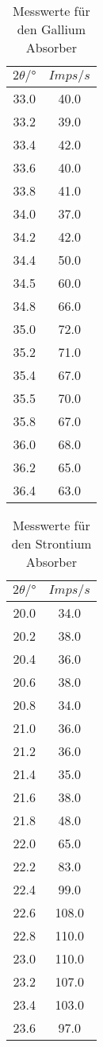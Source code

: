 \begin{table}[H]
    \centering
    \caption{Messwerte für den Gallium Absorber}
    \label{tab:6}
    \begin{tabular}{c c}
        \toprule
        $2 \theta /° $ & $Imps/s$ \\
        \midrule
        33.0  & 40.0 \\
        33.2  & 39.0 \\
        33.4  & 42.0 \\
        33.6  & 40.0 \\
        33.8  & 41.0 \\
        34.0  & 37.0 \\
        34.2  & 42.0 \\
        34.4  & 50.0 \\
        34.5  & 60.0 \\
        34.8  & 66.0 \\
        35.0  & 72.0 \\
        35.2  & 71.0 \\
        35.4  & 67.0 \\
        35.5  & 70.0 \\
        35.8  & 67.0 \\
        36.0  & 68.0 \\
        36.2  & 65.0 \\
        36.4  & 63.0 \\
        \bottomrule
    \end{tabular}
\end{table}

\begin{table}[H]
    \centering
    \caption{Messwerte für den Strontium Absorber}
    \label{tab:7}
    \begin{tabular}{c c}
        \toprule
        $2 \theta /° $ & $Imps/s$ \\
        \midrule
        20.0  & 34.0 \\
        20.2  & 38.0 \\
        20.4  & 36.0 \\
        20.6  & 38.0 \\
        20.8  & 34.0 \\
        21.0  & 36.0 \\
        21.2  & 36.0 \\
        21.4  & 35.0 \\
        21.6  & 38.0 \\
        21.8  & 48.0 \\
        22.0  & 65.0 \\
        22.2  & 83.0 \\
        22.4  & 99.0 \\
        22.6  & 108.0\\
        22.8  & 110.0\\
        23.0  & 110.0\\
        23.2  & 107.0\\
        23.4  & 103.0\\
        23.6  & 97.0 \\
        \bottomrule
    \end{tabular}
\end{table}